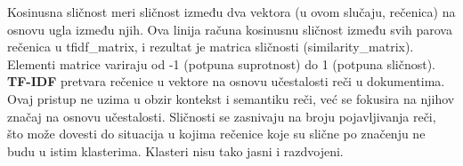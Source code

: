 \documentclass{article}
\begin{document}
Kosinusna sličnost meri sličnost između dva vektora (u ovom slučaju, rečenica) na osnovu ugla između njih. Ova linija računa kosinusnu sličnost između svih parova rečenica u tfidf\_matrix, i rezultat je matrica sličnosti (similarity\_matrix). Elementi matrice variraju od -1 (potpuna suprotnost) do 1 (potpuna sličnost).
\newline
\newline
\newline
\newline
\textbf{TF-IDF} pretvara rečenice u vektore na osnovu učestalosti reči u dokumentima. Ovaj pristup ne uzima u obzir kontekst i semantiku reči, već se fokusira na njihov značaj na osnovu učestalosti. Sličnosti se zasnivaju na broju pojavljivanja reči, što može dovesti do situacija u kojima rečenice koje su slične po značenju ne budu u istim klasterima. 
Klasteri nisu tako jasni i razdvojeni.
\end{document}
